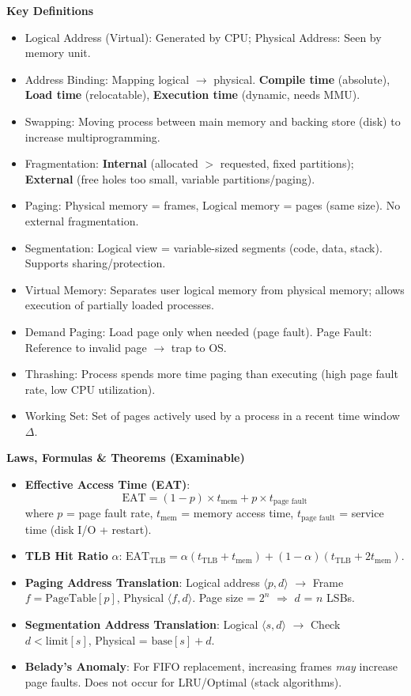 \documentclass[11pt]{article}
\newcommand{\cle}[1]{{\popxbold\color{popdark}#1}}
\begin{document}
\begin{bilan}

\textbf{Key Definitions}
\begin{itemize}
    \item \cle{Logical Address} (Virtual): Generated by CPU; \cle{Physical Address}: Seen by memory unit.
    \item \cle{Address Binding}: Mapping logical $\to$ physical. \textbf{Compile time} (absolute), \textbf{Load time} (relocatable), \textbf{Execution time} (dynamic, needs MMU).
    \item \cle{Swapping}: Moving process between main memory and backing store (disk) to increase multiprogramming.
    \item \cle{Fragmentation}: \textbf{Internal} (allocated $>$ requested, fixed partitions); \textbf{External} (free holes too small, variable partitions/paging).
    \item \cle{Paging}: Physical memory = \cle{frames}, Logical memory = \cle{pages} (same size). No external fragmentation.
    \item \cle{Segmentation}: Logical view = variable-sized \cle{segments} (code, data, stack). Supports sharing/protection.
    \item \cle{Virtual Memory}: Separates user logical memory from physical memory; allows execution of partially loaded processes.
    \item \cle{Demand Paging}: Load page only when needed (page fault). \cle{Page Fault}: Reference to invalid page $\to$ trap to OS.
    \item \cle{Thrashing}: Process spends more time paging than executing (high page fault rate, low CPU utilization).
    \item \cle{Working Set}: Set of pages actively used by a process in a recent time window $\Delta$.
\end{itemize}

\textbf{Laws, Formulas \& Theorems (Examinable)}
\begin{itemize}
    \item \textbf{Effective Access Time (EAT)}: 
    \[
    \text{EAT} = (1-p) \times t_{\text{mem}} + p \times t_{\text{page fault}}
    \]
    where $p$ = page fault rate, $t_{\text{mem}}$ = memory access time, $t_{\text{page fault}}$ = service time (disk I/O + restart).
    \item \textbf{TLB Hit Ratio} $\alpha$: $\text{EAT}_{\text{TLB}} = \alpha(t_{\text{TLB}}+t_{\text{mem}}) + (1-\alpha)(t_{\text{TLB}}+2t_{\text{mem}})$.
    \item \textbf{Paging Address Translation}: Logical address $\langle p, d \rangle$ $\to$ Frame $f = \text{PageTable}[p]$, Physical $\langle f, d \rangle$. Page size = $2^n$ $\Rightarrow$ $d$ = $n$ LSBs.
    \item \textbf{Segmentation Address Translation}: Logical $\langle s, d \rangle$ $\to$ Check $d < \text{limit}[s]$, Physical = $\text{base}[s] + d$.
    \item \textbf{Belady's Anomaly}: For FIFO replacement, increasing frames \emph{may} increase page faults. Does not occur for LRU/Optimal (stack algorithms).
\end{itemize}


\end{bilan}
\end{document}
